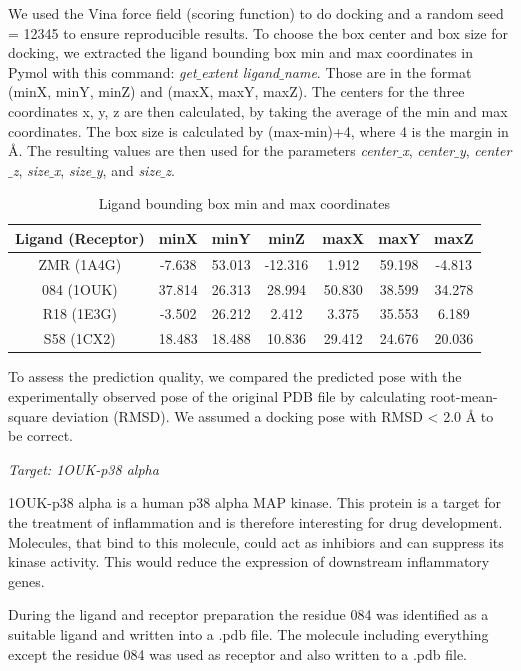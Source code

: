 \documentclass[a4paper,10pt]{article}
\begin{document}
We used the Vina force field (scoring function) to do docking and a random seed = 12345 to ensure reproducible results. To choose the box center and box size for docking, we extracted the ligand bounding box min and max coordinates in Pymol with this command: \textit{get$\_$extent ligand$\_$name}. Those are in the format (minX, minY, minZ) and (maxX, maxY, maxZ). The centers for the three coordinates x, y, z are then calculated, by taking the average of the min and max coordinates. The box size is calculated by (max-min)+4, where 4 is the margin in Å. The resulting values are then used for the parameters \textit{center$\_$x}, \textit{center$\_$y}, \textit{center$\_$z}, \textit{size$\_$x}, \textit{size$\_$y}, and \textit{size$\_$z}.

\begin{table}[h!]
\centering
\caption{Ligand bounding box min and max coordinates}
\label{tab:box}
\begin{tabular}{|c|c|c|c|c|c|c|}
\hline
\textbf{Ligand (Receptor)} & \textbf{minX} & \textbf{minY} & \textbf{minZ} & \textbf{maxX} & \textbf{maxY} & \textbf{maxZ} \\
\hline
ZMR (1A4G) & -7.638 & 53.013 & -12.316&1.912 &59.198 &-4.813 \\
084 (1OUK) &37.814  &26.313  &28.994 &50.830 &38.599 &34.278 \\
R18 (1E3G) & -3.502  & 26.212  &2.412 &3.375 &35.553 & 6.189\\
S58 (1CX2) & 18.483  & 18.488  & 10.836 & 29.412 & 24.676 & 20.036\\
\hline
\end{tabular}
\end{table}


To assess the prediction quality, we compared the predicted pose with the experimentally observed pose of the original PDB file by calculating root-mean-square deviation (RMSD). We assumed a docking pose with RMSD < 2.0 Å to be correct.

\textit{Target: 1OUK-p38 alpha}

1OUK-p38 alpha is  a human p38 alpha MAP kinase. This protein is a target for the treatment of inflammation and is therefore interesting for drug development. Molecules, that bind to this molecule, could act as inhibiors and can suppress its kinase activity. This would reduce the expression of downstream inflammatory genes. \cite{1OUK}

During the ligand and receptor preparation the residue 084 was identified as a suitable ligand and written into a .pdb file. The molecule including everything except the residue 084 was used as receptor and also written to a .pdb file. 
\end{document}

